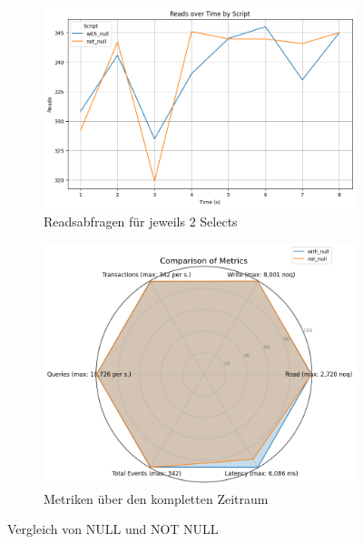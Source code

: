 \vspace{-15pt}
\begin{figure}[H]
    \centering
    \begin{subfigure}[t]{0.48\textwidth}
        \centering
        \includegraphics[width=\textwidth]{PNGs/Script/Data_Types/Null/null-check/Reads}
        \caption{Readsabfragen für jeweils 2 Selects}
        \label{data-types-null-reads}
    \end{subfigure}
    \hfill
    \begin{subfigure}[t]{0.48\textwidth}
        \centering
        \includegraphics[width=\textwidth]{PNGs/Script/Data_Types/Null/null-check/statistics}
        \caption{Metriken über den kompletten Zeitraum}
        \label{fig:data-types-null-statistics}
    \end{subfigure}
    \caption{Vergleich von NULL und NOT NULL}
\end{figure}
\vspace{-20pt}

